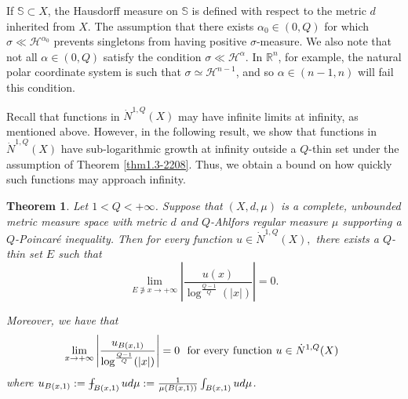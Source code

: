 \documentclass[10pt]{amsart}
\def\Xint#1{\mathchoice
	{\XXint\displaystyle\textstyle{#1}}
	{\XXint\textstyle\scriptstyle{#1}}
	{\XXint\scriptstyle\scriptscriptstyle{#1}}
	{\XXint\scriptscriptstyle\scriptscriptstyle{#1}}
	\!\int}
\def\XXint#1#2#3{{\setbox0=\hbox{$#1{#2#3}{\int}$ }
		\vcenter{\hbox{$#2#3$ }}\kern-.6\wd0}}
\def\dashint{\Xint-}
\newtheorem{theorem}{Theorem}[section]
\numberwithin{equation}{section}
\newcommand{\Ha}{\mathcal{H}}
\newcommand{\R}{\mathbb{R}}
\begin{document}

{
If $\mathbb{S}\subset X$,} the Hausdorff measure on $\mathbb{S}$ is defined with respect to the metric $d$ inherited from $X$.  The assumption that there exists $\alpha_0\in (0,Q)$ for which $\sigma\ll\Ha^{\alpha_0}$ prevents singletons from having positive $\sigma$-measure.  We also note that not all $\alpha\in (0,Q)$ satisfy the condition $\sigma\ll\Ha^{\alpha}$.  In $\R^n$, for example, the natural polar coordinate system is such that $\sigma\simeq\Ha^{n-1}$, and so $\alpha\in (n-1,n)$ will fail this condition. 

Recall that functions in $\dot N^{1,Q}(X)$ may have infinite limits at infinity, as mentioned above. 
 However, in the following result, we show that functions in $\dot N^{1,Q}(X)$ have sub-logarithmic growth at infinity outside a $Q$-thin set under the assumption of Theorem \ref{thm1.3-2208}.  Thus, we obtain a bound on how quickly such functions may approach infinity.
 
 \begin{theorem}\label{thm1-2705}
 Let $1<Q<{+\infty}$. 
Suppose that $(X,d,\mu)$ is a complete, unbounded metric measure space with metric $d$ and $Q$-Ahlfors regular measure $\mu$ supporting a $Q$-Poincar\'e inequality. Then for every function $u\in \dot N^{1,Q}(X),$ there exists a $Q$-thin set $E$ such that
 	\begin{equation}
		\label{eq1.1-2705}
		\lim_{E\not\ni x\to{+\infty}} \left | \frac{u(x)}{\log^{\frac{Q-1}{Q}}(|x|)} \right|=0.
	\end{equation}

Moreover, we have that 
	\begin{equation}\label{equ1.2-2805}
		\lim_{x\to{+\infty}} \left | \frac{u_{B(x,1)}}{\log^{\frac{Q-1}{Q}}(|x|)}\right|=0 \text{\rm \ \ for every function $u\in \dot  N^{1,Q}(X)$ }
	\end{equation}
where
 $u_{B(x,1)}:=\dashint_{B(x,1)}ud\mu:=\frac{1}{\mu(B(x,1))}\int_{B(x,1)}ud\mu$.
 \end{theorem}
\end{document}
